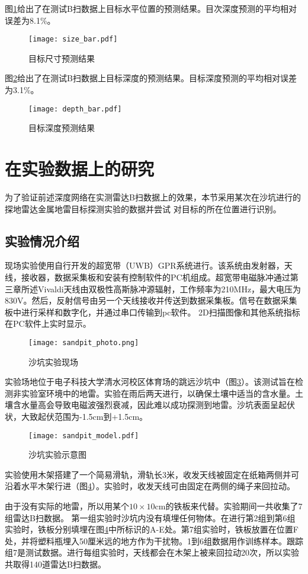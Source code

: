 图\ref{size_bar}给出了在测试B扫数据上目标水平位置的预测结果。目次深度预测的平均相对误差为8.1\%。
\begin{figure}[htbp]
	\texttt{[image: size\_bar.pdf]}
	\caption[]{目标尺寸预测结果}
	\label{size_bar}
\end{figure}

图\ref{depth_bar}给出了在测试B扫数据上目标深度的预测结果。目标深度预测的平均相对误差为3.1\%。
\begin{figure}[htbp]
	\texttt{[image: depth\_bar.pdf]}
	\caption[]{目标深度预测结果}
	\label{depth_bar}
\end{figure}
\section{在实验数据上的研究}
为了验证前述深度网络在实测雷达B扫数据上的效果，本节采用某次在沙坑进行的探地雷达金属地雷目标探测实验的数据并尝试
对目标的所在位置进行识别。
\subsection{实验情况介绍}
现场实验使用自行开发的超宽带（UWB）GPR系统进行。该系统由发射器，天线，接收器，数据采集板和安装有控制软件的PC机组成。超宽带电磁脉冲通过第三章所述Vivaldi天线由双极性高斯脉冲源辐射，工作频率为210MHz，最大电压为830V。然后，反射信号由另一个天线接收并传送到数据采集板。信号在数据采集板中进行采样和数字化，并通过串口传输到pc软件。 2D扫描图像和其他系统指标在PC软件上实时显示。
\begin{figure}[htbp]
	\texttt{[image: sandpit\_photo.png]}
	\caption[]{沙坑实验现场}
	\label{sandpit_photo}
\end{figure}

实验场地位于电子科技大学清水河校区体育场的跳远沙坑中（图\ref{sandpit_photo}）。该测试旨在检测非实验室环境中的地雷。实验在雨后两天进行，以确保土壤中适当的含水量。土壤含水量高会导致电磁波强烈衰减，因此难以成功探测到地雷。沙坑表面呈起伏状，大致起伏范围为-1.5cm到+1.5cm。
\begin{figure}[htbp]
	\texttt{[image: sandpit\_model.pdf]}
	\caption[]{沙坑实验示意图}
	\label{sandpit_model}
\end{figure}

实验使用木架搭建了一个简易滑轨，滑轨长3米，收发天线被固定在纸箱两侧并可沿着水平木架行进（图\ref{sandpit_model}）。实验时，收发天线可由固定在两侧的绳子来回拉动。

由于没有实际的地雷，所以用某个$10\times 10$cm的铁板来代替。实验期间一共收集了7组雷达B扫数据。
第一组实验时沙坑内没有填埋任何物体。在进行第2组到第6组实验时，铁板分别填埋在图\ref{sandpit_model}中所标识的A-E处。第7组实验时，铁板放置在位置F处，并将塑料瓶埋入50厘米远的地方作为干扰物。1到6组数据用作训练样本。跟踪组7是测试数据。进行每组实验时，天线都会在木架上被来回拉动20次，所以实验共取得140道雷达B扫数据。
